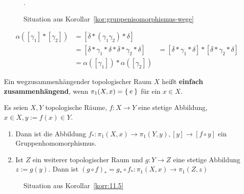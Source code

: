 \begin{figure}
    \centering
    
    \caption{Situation aus Korollar~\ref{kor:gruppenisomorphismus-wege}}.
    \label{fig:situation-gruppenisomorphismus-wege}
\end{figure}

\begin{beweis}
    \begin{align*}
        \alpha([\gamma_1] * [\gamma_2]) &= [\overline{\delta} * (\gamma_1 \gamma_2) * \delta]\\
        &= [\overline{\delta} * \gamma_1 * \delta * \overline{\delta} * \gamma_2 * \delta]
        &= [\overline{\delta} * \gamma_1 * \delta] * [\overline{\delta} * \gamma_2 * \delta]\\
        &= \alpha([\gamma_1]) * \alpha([\gamma_2])
    \end{align*}
\end{beweis}

\begin{definition}%
    Ein wegzusammenhängender topologischer Raum $X$ heißt
    \textbf{einfach zusammenhängend}, wenn $\pi_1(X,x) = \Set{e}$
    für ein  $x \in X$.
\end{definition}

\begin{korollar}\label{korr:11.5}
    Es seien $X, Y$ topologische Räume, $f:X \rightarrow Y$ eine
    stetige Abbildung, $x \in X, y := f(x) \in Y$.

    \begin{enumerate}[label=\alph*)]
        \item Dann ist die Abbildung $f_* : \pi_1(X,x) \rightarrow \pi_1(Y, y),
        [y] \rightarrow [f \circ y]$ ein Gruppenhomomorphismus.
        \item Ist $Z$ ein weiterer topologischer Raum und $g: Y \rightarrow Z$
              eine stetige Abbildung $z:= g(y)$. Dann ist
              $(g \circ f)_* = g_* \circ f_*: \pi_1(X,x) \rightarrow \pi_1(Z,z)$
    \end{enumerate}
\end{korollar}

\begin{figure}
    \centering
    
    \caption{Situation aus Korollar~\ref{korr:11.5}}
    \label{fig:kor-bem-11.5}
\end{figure}

